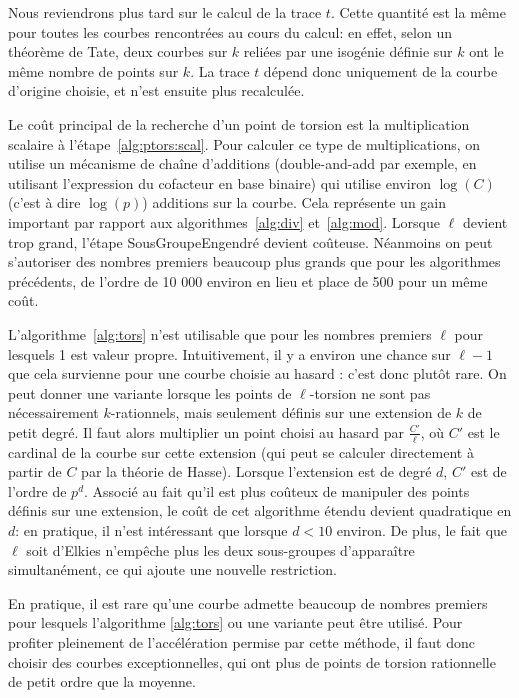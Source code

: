 \documentclass[11pt,a4paper]{article}
\renewcommand{\v}{\vspace{5mm}}
\theoremstyle{definition}
\begin{document}
Nous reviendrons plus tard sur le calcul de la trace $t$. Cette quantité est la même pour toutes les courbes rencontrées au cours du calcul: en effet, selon un théorème de Tate, deux courbes sur $k$ reliées par une isogénie définie sur $k$ ont le même nombre de points sur $k$. La trace $t$ dépend donc uniquement de la courbe d'origine choisie, et n'est ensuite plus recalculée.

Le coût principal de la recherche d'un point de torsion est la multiplication scalaire à l'étape~\ref{alg:ptors:scal}. Pour calculer ce type de multiplications, on utilise un mécanisme de chaîne d'additions (double-and-add par exemple, en utilisant l'expression du cofacteur en base binaire) qui utilise environ $\log(C)$ (c'est à dire $\log(p)$) additions sur la courbe. Cela représente un gain important par rapport aux algorithmes~\ref{alg:div} et~\ref{alg:mod}. Lorsque $\ell$ devient trop grand, l'étape {\sc SousGroupeEngendré} devient coûteuse. Néanmoins on peut s'autoriser des nombres premiers beaucoup plus grands que pour les algorithmes précédents, de l'ordre de 10 000 environ en lieu et place de 500 pour un même coût.
\v

L'algorithme~\ref{alg:tors} n'est utilisable que pour les nombres premiers $\ell$ pour lesquels 1 est valeur propre. Intuitivement, il y a environ une chance sur $\ell - 1$ que cela survienne pour une courbe choisie \og au hasard \fg : c'est donc plutôt rare. On peut donner une variante lorsque les points de $\ell$-torsion ne sont pas nécessairement $k$-rationnels, mais seulement définis sur une extension de $k$ de petit degré. Il faut alors multiplier un point choisi au hasard par $\frac{C'}{\ell}$, où $C'$ est le cardinal de la courbe sur cette extension (qui peut se calculer directement à partir de $C$ par la théorie de Hasse). Lorsque l'extension est de degré $d$, $C'$ est de l'ordre de $p^d$. Associé au fait qu'il est plus coûteux de manipuler des points définis sur une extension, le coût de cet algorithme étendu devient quadratique en $d$: en pratique, il n'est intéressant que lorsque $d<10$ environ. De plus, le fait que $\ell$ soit d'Elkies n'empêche plus les deux sous-groupes d'apparaître simultanément, ce qui ajoute une nouvelle restriction.

En pratique, il est rare qu'une courbe admette beaucoup de nombres premiers pour lesquels l'algorithme \ref{alg:tors} ou une variante peut être utilisé. Pour profiter pleinement de l'accélération permise par cette méthode, il faut donc choisir des courbes exceptionnelles, qui ont plus de points de torsion rationnelle de petit ordre que la moyenne.
\end{document}
